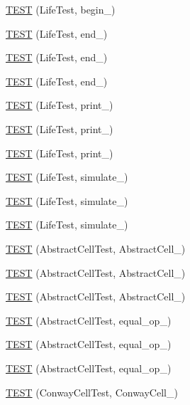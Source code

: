 \begin{DoxyCompactItemize}
\item 
\hyperlink{TestLife_8c_09_09_a0f4b1e00d44c4d4aaa274622639818db}{T\-E\-S\-T} (Life\-Test, begin\-\_)
\item 
\hyperlink{TestLife_8c_09_09_a9b51697d83cccfdfc280496b6865bd58}{T\-E\-S\-T} (Life\-Test, end\-\_)
\item 
\hyperlink{TestLife_8c_09_09_ab0a9f8605543d17aab6d735c0cbedf24}{T\-E\-S\-T} (Life\-Test, end\-\_)
\item 
\hyperlink{TestLife_8c_09_09_a9a4a44d95a3475b140bd3cef6777c104}{T\-E\-S\-T} (Life\-Test, end\-\_)
\item 
\hyperlink{TestLife_8c_09_09_aeffa3fa10d203f611862b3feed93cd7a}{T\-E\-S\-T} (Life\-Test, print\-\_)
\item 
\hyperlink{TestLife_8c_09_09_a79bab006b2b9daff9f5a3b840ab007ae}{T\-E\-S\-T} (Life\-Test, print\-\_)
\item 
\hyperlink{TestLife_8c_09_09_a3c6c9e91f5ed6c79cfebe5aad1347873}{T\-E\-S\-T} (Life\-Test, print\-\_)
\item 
\hyperlink{TestLife_8c_09_09_a522bdfa88285c65866a0cf3c5258fc4d}{T\-E\-S\-T} (Life\-Test, simulate\-\_)
\item 
\hyperlink{TestLife_8c_09_09_ab0830bf75e99187367c4ac27b3e52828}{T\-E\-S\-T} (Life\-Test, simulate\-\_)
\item 
\hyperlink{TestLife_8c_09_09_af02c0d2db8b27596986f0ffac7059375}{T\-E\-S\-T} (Life\-Test, simulate\-\_)
\item 
\hyperlink{TestLife_8c_09_09_ad97b7e742720b367fd3290eaa918942a}{T\-E\-S\-T} (Abstract\-Cell\-Test, Abstract\-Cell\-\_)
\item 
\hyperlink{TestLife_8c_09_09_a4286bbe57eda2c0c674fdafac7c29e9f}{T\-E\-S\-T} (Abstract\-Cell\-Test, Abstract\-Cell\-\_)
\item 
\hyperlink{TestLife_8c_09_09_a6c29ea2ac2148997a197cc835bfc091c}{T\-E\-S\-T} (Abstract\-Cell\-Test, Abstract\-Cell\-\_)
\item 
\hyperlink{TestLife_8c_09_09_afc8683fbc1d0aad2bd979b6dc1128e2e}{T\-E\-S\-T} (Abstract\-Cell\-Test, equal\-\_\-op\-\_)
\item 
\hyperlink{TestLife_8c_09_09_adb8aeea48225ef6ef1efe77db98ff774}{T\-E\-S\-T} (Abstract\-Cell\-Test, equal\-\_\-op\-\_)
\item 
\hyperlink{TestLife_8c_09_09_a6dbca017ff86cbd298cec5fc2e26c04a}{T\-E\-S\-T} (Abstract\-Cell\-Test, equal\-\_\-op\-\_)
\item 
\hyperlink{TestLife_8c_09_09_ac4e7a50328c0b145bdc120130d53153f}{T\-E\-S\-T} (Conway\-Cell\-Test, Conway\-Cell\-\_)

\end{DoxyCompactItemize}
